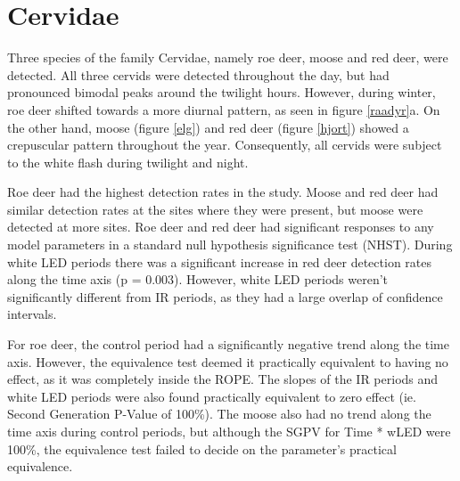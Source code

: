 \pagestyle{empty} %
%

\clearpage %
\pagestyle{fancy} %
\section{Cervidae}
Three species of the family Cervidae, namely roe deer, moose and red deer, were detected.
All three cervids were detected throughout the day, but had pronounced bimodal peaks around the twilight hours. %
However, during winter, roe deer shifted towards a more diurnal pattern, as seen in figure \ref{raadyr}a. 
On the other hand, moose (figure \ref{elg}) and red deer (figure \ref{hjort}) showed a crepuscular pattern throughout the year.
Consequently, all cervids were subject to the white flash during twilight and night. %

Roe deer had the highest detection rates in the study. Moose and red deer had similar detection rates at the sites where they were present, but moose were detected at more sites.
Roe deer and red deer had significant responses to any model parameters in a standard null hypothesis significance test (NHST). During white LED periods there was a significant increase in red deer detection rates along the time axis (p = 0.003). However, white LED periods weren't significantly different from IR periods, as they had a large overlap of confidence intervals. 

For roe deer, the control period had a significantly negative trend along the time axis. However, the equivalence test deemed it practically equivalent to having no effect, as it was completely inside the ROPE. The slopes of the IR periods and white LED periods were also found practically equivalent to zero effect (ie. Second Generation P-Value of 100\%).
The moose also had no trend along the time axis during control periods, but although the SGPV for Time * wLED were 100\%, the equivalence test failed to decide %
on the parameter’s practical equivalence. %


